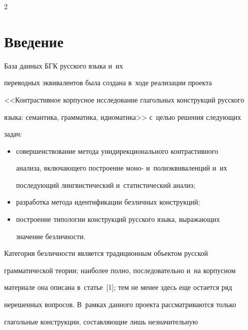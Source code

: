 \thispagestyle{headings}



\begin{multicols}{2}



\label{st\stat}

  

\section{Введение}



  База данных БГК русского языка и~их 

переводных эквивалентов была создана в~ходе реализации проекта 

<<Контрастивное корпусное исследование глагольных конструкций русского 

языка: семантика, грамматика, идиоматика>> с~целью решения следующих 

задач:

  \begin{itemize}

\item совершенствование метода унидирекционального контрастивного 

анализа, включающего построение моно- и~полиэквиваленций и~их 

последующий лингвистический и~статистический анализ; 

\item разработка метода идентификации безличных конструкций; 

\item построение типологии конструкций русского языка, выражающих 

значение безличности.

\end{itemize}



  Категория безличности является традиционным объектом русской 

грамматической теории; наиболее полно, последовательно и~на корпусном 

материале она описана в~статье~[1]; тем не менее здесь еще остается ряд 

нерешенных вопросов. В~рамках данного проекта рассматриваются только 

глагольные конструкции, со\-став\-ля\-ющие лишь незначительную\linebreak\vspace*{-12pt}




\end{multicols}
